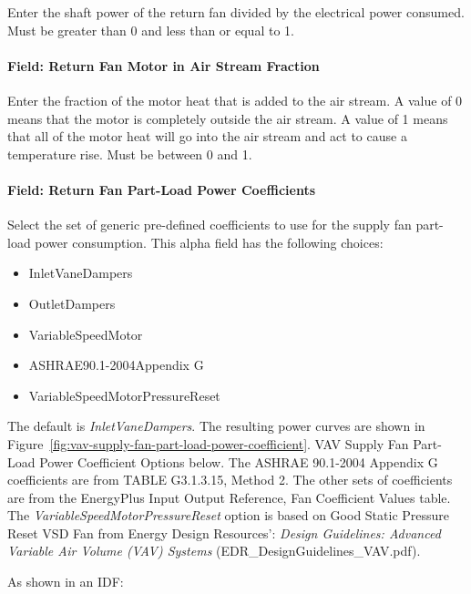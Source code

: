 Enter the shaft power of the return fan divided by the electrical power consumed. Must be greater than 0 and less than or equal to 1.

\paragraph{Field: Return Fan Motor in Air Stream Fraction}\label{field-return-fan-motor-in-air-stream-fraction-6}

Enter the fraction of the motor heat that is added to the air stream. A value of 0 means that the motor is completely outside the air stream. A value of 1 means that all of the motor heat will go into the air stream and act to cause a temperature rise. Must be between 0 and 1.

\paragraph{Field: Return Fan Part-Load Power Coefficients}\label{field-return-fan-part-load-power-coefficients-2}

Select the set of generic pre-defined coefficients to use for the supply fan part-load power consumption. This alpha field has the following choices:

\begin{itemize}
\item
  InletVaneDampers
\item
  OutletDampers
\item
  VariableSpeedMotor
\item
  ASHRAE90.1-2004Appendix G
\item
  VariableSpeedMotorPressureReset
\end{itemize}

The default is \emph{InletVaneDampers}. The resulting power curves are shown in Figure~\ref{fig:vav-supply-fan-part-load-power-coefficient}. VAV Supply Fan Part-Load Power Coefficient Options below. The ASHRAE 90.1-2004 Appendix G coefficients are from TABLE G3.1.3.15, Method 2. The other sets of coefficients are from the EnergyPlus Input Output Reference, Fan Coefficient Values table. The \emph{VariableSpeedMotorPressureReset} option is based on Good Static Pressure Reset VSD Fan from Energy Design Resources': \emph{Design Guidelines: Advanced Variable Air Volume (VAV) Systems} (EDR\_DesignGuidelines\_VAV.pdf).

As shown in an IDF:

